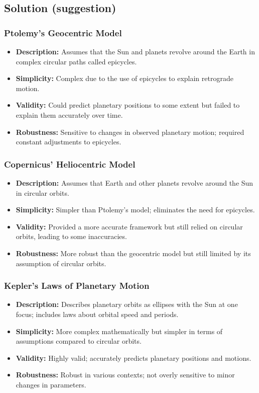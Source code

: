 \documentclass{beamer}
\begin{document}
\subsection{Solution (suggestion)}
%
\begin{frame}
\frametitle{Ptolemy's Geocentric Model}
\begin{itemize}
    \item \textbf{Description:} Assumes that the Sun and planets revolve around the Earth in complex circular paths called epicycles.
    \item \textbf{Simplicity:} Complex due to the use of epicycles to explain retrograde motion.
    \item \textbf{Validity:} Could predict planetary positions to some extent but failed to explain them accurately over time.
    \item \textbf{Robustness:} Sensitive to changes in observed planetary motion; required constant adjustments to epicycles.
\end{itemize}
\end{frame}
%
\begin{frame}
\frametitle{Copernicus' Heliocentric Model}
\begin{itemize}
    \item \textbf{Description:} Assumes that Earth and other planets revolve around the Sun in circular orbits.
    \item \textbf{Simplicity:} Simpler than Ptolemy's model; eliminates the need for epicycles.
    \item \textbf{Validity:} Provided a more accurate framework but still relied on circular orbits, leading to some inaccuracies.
    \item \textbf{Robustness:} More robust than the geocentric model but still limited by its assumption of circular orbits.
\end{itemize}
\end{frame}
%
\begin{frame}
\frametitle{Kepler's Laws of Planetary Motion}
\begin{itemize}
    \item \textbf{Description:} Describes planetary orbits as ellipses with the Sun at one focus; includes laws about orbital speed and periods.
    \item \textbf{Simplicity:} More complex mathematically but simpler in terms of assumptions compared to circular orbits.
    \item \textbf{Validity:} Highly valid; accurately predicts planetary positions and motions.
    \item \textbf{Robustness:} Robust in various contexts; not overly sensitive to minor changes in parameters.
\end{itemize}
\end{frame}
\end{document}
